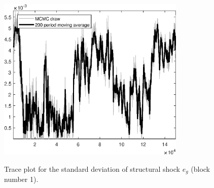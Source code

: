 \begin{figure}[H]
\centering
  \includegraphics[width=0.8\textwidth]{BRS_sectoral_KK/graphs/TracePlot_SE_e_g_blck_1}\\
    \caption{Trace plot for the standard deviation of structural shock ${e_g}$ (block number 1).}
\end{figure}
